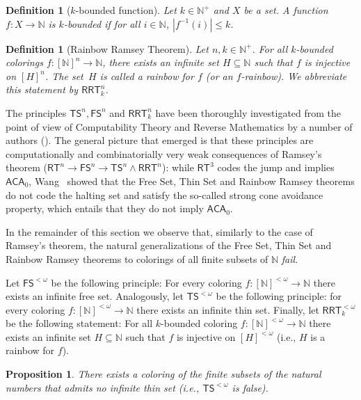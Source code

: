 \documentclass{article}
\newcommand{\ACA}[0]{\mathsf{ACA}}
\newcommand{\RRT}[0]{\mathsf{RRT}}
\newcommand{\FS}[0]{\mathsf{FS}}
\newcommand{\TS}[0]{\mathsf{TS}}
\newcommand{\RT}[0]{\mathsf{RT}}
\newcommand{\NN}[0]{\mathbb{N}}
\numberwithin{theorem}{section}
\newtheorem{proposition}[theorem]{Proposition}
\newtheorem{definition}[theorem]{Definition}
\begin{document}
\begin{definition}[$k$-bounded function]
 Let $k\in\NN^+$ and $X$ be a set. A function $f : X \to \NN$ is $k$-bounded if for all $i\in \NN$, 
 $|f^{-1}(i)|\leq k$.
\end{definition}

\begin{definition}[Rainbow Ramsey Theorem]
Let $n, k\in \NN^+$. For all $k$-bounded colorings $f:[\NN]^{n} \to \NN$, there exists an infinite set $H\subseteq \NN$ such that $f$ is injective on $[H]^{n}$. The set~$H$ is called a \emph{rainbow} for $f$ (or an $f$-rainbow).
We abbreviate this statement by $\RRT^{n}_k$. 
\end{definition}

The principles $\TS^n, \FS^n$ and $\RRT^n_k$ have been thoroughly investigated from the point of view of Computability Theory and Reverse Mathematics by a number of authors (\cite{Cholak_Giusto_Hirst_Jockusch_2005, Pat:16, cholak2020thin, Liu2022-LIUTRM}). The general picture that emerged is that these principles are computationally and combinatorially very weak consequences of Ramsey's theorem ($\RT^n \to \FS^n \to \TS^n \wedge \RRT^n$): while $\RT^3$ codes the jump and implies $\ACA_0$, Wang~\cite{wang2014some} showed that the Free Set, Thin Set and Rainbow Ramsey theorems do not code the halting set and satisfy the so-called strong cone avoidance property, which entails that they do not imply $\ACA_0$. 

In the remainder of this section we observe that, similarly to the case of Ramsey's theorem, the natural generalizations of the Free Set, Thin Set and Rainbow Ramsey theorems to colorings of all finite subsets of $\NN$ {\em fail}. 

Let $\FS^{<\omega}$ be the following principle: For every coloring $f:[\NN]^{<\omega} \to \NN$ there exists an infinite free set. Analogously, let $\TS^{<\omega}$ be the following principle: for every coloring $f:[\NN]^{<\omega} \to \NN$ there exists an infinite thin set. 
Finally, let $\RRT^{<\omega}_k$ be the following statement: For all $k$-bounded coloring $f:[\NN]^{<\omega} \to \NN$ there exists
an infinite set $H\subseteq \NN$ such that $f$ is injective on $[H]^{<\omega}$ (i.e., $H$ is a rainbow for $f$). 


\begin{proposition}
There exists a coloring of the finite subsets of the natural numbers that admits no infinite thin set (i.e., $\TS^{<\omega}$ is false).
\end{proposition}
\end{document}
